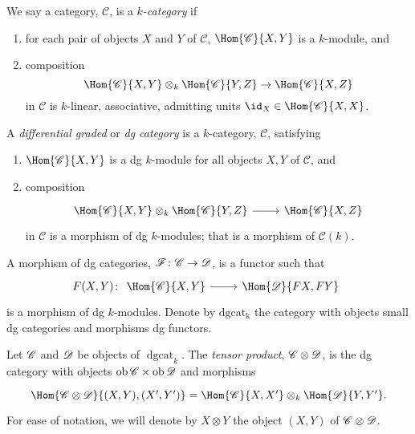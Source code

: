 \documentclass[10pt]{amsart}
\begin{document}
\begin{defn}
  We say a category, $\mathscr{C}$, is a {\it $k$-category} if
  \begin{enumerate}
    \item
      for each pair of objects $X$ and $Y$ of $\mathscr{C}$, $\Hom{\mathscr{C}}{X,Y}$ is a $k$-module, and
      \item
        composition 
        $$\Hom{\mathscr{C}}{X,Y} \otimes_k \Hom{\mathscr{C}}{Y,Z} \rightarrow \Hom{\mathscr{C}}{X,Z}$$
        in $\mathscr{C}$ is $k$-linear, associative, admitting units $\id_X \in \Hom{\mathscr{C}}{X,X}$.
  \end{enumerate}
\end{defn}

\begin{defn}
  A {\it differential graded} or {\it dg category} is a $k$-category, $\mathscr{C}$, satisfying
  \begin{enumerate}
  \item
    $\Hom{\mathscr{C}}{X,Y}$ is a dg $k$-module for all objects $X,Y$ of $\mathscr{C}$, and
  \item
    composition 
    $$\begin{tikzcd}
      \Hom{\CC}{X,Y} \otimes_k \Hom{\CC}{Y,Z} \arrow{r} & \Hom{\CC}{X,Z}
    \end{tikzcd}$$
    in $\mathscr{C}$ is a morphism of dg $k$-modules;
    that is a morphism of $\mathcal{C}(k)$.
  \end{enumerate}
  
  A morphism of dg categories, $\mathscr{F} \colon \mathscr{C} \rightarrow \mathscr{D}$, is a functor such that
  $$F(X,Y) \colon 
  \begin{tikzcd}
    \Hom{\CC}{X,Y} \arrow{r} & \Hom{\D}{FX,FY}
  \end{tikzcd}$$
  is a morphism of dg $k$-modules.
  Denote by $\operatorname{dgcat_k}$ the category with objects small dg categories and morphisms dg functors.
\end{defn}

\begin{defn}
  Let $\mathscr{C}$ and $\mathscr{D}$ be objects of $\operatorname{dgcat}_k$.
  The {\it tensor product}, $\mathscr{C} \otimes \mathscr{D}$, is the dg category with objects $\operatorname{ob}\mathscr{C} \times \operatorname{ob}\mathscr{D}$ and
  morphisms
  $$\begin{tikzcd}
    \Hom{\CC \otimes \D}{(X, Y), (X^\prime, Y^\prime)} = \Hom{\CC}{X,X^\prime} \otimes_k \Hom{\D}{Y,Y^\prime}.
  \end{tikzcd}$$
  For ease of notation, we will denote by $X \otimes Y$ the object $(X,Y)$ of $\mathscr{C} \otimes \mathscr{D}$.
\end{defn}
\end{document}

